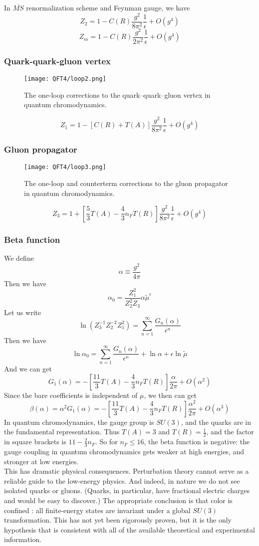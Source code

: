 \documentclass[cyan]{elegantnote}
\begin{document}
\noindent
In $\overline{MS}$ renormalization scheme and Feynman gauge, we have
\[Z_2 = 1 - C(R)\frac{g^2}{8\pi^2}\frac{1}{\epsilon} + O(g^4)\]
\[Z_m = 1 - C(R)\frac{g^2}{2\pi^2}\frac{1}{\epsilon} + O(g^4)\]

\subsubsection{Quark-quark-gluon vertex}
\begin{figure}[!h]
	\centering
	\texttt{[image: QFT4/loop2.png]}
	\caption{The one-loop corrections to the quark–quark–gluon vertex in quantum chromodynamics.}
\end{figure}
\[Z_1 = 1 - [C(R) + T(A)]\frac{g^2}{8\pi^2}\frac{1}{\epsilon} + O(g^4)\]

\subsubsection{Gluon propagator}
\begin{figure}[!h]
	\centering
	\texttt{[image: QFT4/loop3.png]}
	\caption{The one-loop and counterterm corrections to the gluon propagator in quantum chromodynamics.}
\end{figure}
\[Z_3 = 1 + \left[\frac{5}{3}T(A) - \frac{4}{3}n_F T(R)\right]\frac{g^2}{8\pi^2}\frac{1}{\epsilon} + O(g^4)\]

\subsubsection{Beta function}
We define
\[\alpha \equiv \frac{g^2}{4\pi}\]
Then we have
\[\alpha_0 = \frac{Z_1^2}{Z_2^2 Z_3} \alpha \tilde{\mu}^{\epsilon}\]
Let us write
\[\ln \left( Z_3^{-1}Z_2^{-2}Z_1^2 \right) = \sum_{n=1}^{\infty} \frac{G_n(\alpha)}{\epsilon^n}\]
Then we have
\[\ln \alpha_0 = \sum_{n=1}^{\infty} \frac{G_n(\alpha)}{\epsilon^n} + \ln \alpha + \epsilon \ln \tilde{\mu}\]
And we can get
\[G_1(\alpha) = - \left[ \frac{11}{3}T(A) - \frac{4}{3} n_F T(R) \right] \frac{\alpha}{2\pi} + O(\alpha^2)\]
Since the bare coefficients is independent of $\mu$, we then can get
\[\beta(\alpha) = \alpha^2 G_1(\alpha) = - \left[ \frac{11}{3}T(A) - \frac{4}{3} n_F T(R) \right] \frac{\alpha^2}{2\pi} + O(\alpha^3)\]
In quantum chromodynamics, the gauge group is $SU(3)$, and the quarks are in the fundamental representation. Thus $T(A) = 3$ and $T(R) = \frac{1}{2}$, and the factor in square brackets is $11 - \frac{2}{3} n_F$. So for $n_F \leq 16$, the beta function is negative: the gauge coupling in quantum chromodynamics gets weaker at high energies, and stronger at low energies.\\
This has dramatic physical consequences. Perturbation theory cannot serve as a reliable guide to the low-energy physics. And indeed, in nature we do not see isolated quarks or gluons. (Quarks, in particular, have fractional electric charges and would be easy to discover.) The appropriate conclusion is that color is confined : all finite-energy states are invariant under a global $SU(3)$ transformation. This has not yet been rigorously proven, but it is the
only hypothesis that is consistent with all of the available theoretical and experimental information.
\end{document}
